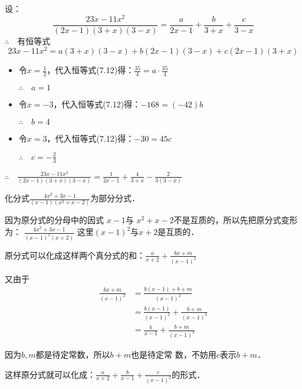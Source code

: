 \begin{solution}
设：
\begin{equation}
    \frac{23x-11x^2}{(2x-1)(3+x)(3-x)}=\frac{a}{2x-1}+\frac{b}{3+x}+\frac{c}{3-x}
\end{equation}
$\therefore\quad $有恒等式
\begin{equation}
    23x-11x^2=a(3+x)(3-x)+b(2x-1)(3-x)+c(2x-1)(3+x)
\end{equation}

\begin{itemize}
    \item 令$x=\frac{1}{2}$，代入恒等式(7.12)得：$\frac{35}{4}=a\cdot \frac{35}{4}$
    
    $\therefore\quad a=1$
    \item 令$x=-3$，代入恒等式(7.12)得：$-168=(-42)b$
    
    $\therefore\quad b=4$
    \item 令$x=3$，代入恒等式(7.12)得：$-30=45c$
    
    $\therefore\quad c=-\frac{2}{3}$
\end{itemize}
$\therefore\quad  \frac{23x-11x^2}{(2x-1)(3+x)(3-x)}=\frac{1}{2x-1}+\frac{4}{3+x}-\frac{2}{3(3-x)}$
\end{solution}

\begin{example}
    化分式$\frac{4x^2+3x-1}{(x-1)(x^2+x-2)}$为部分分式．
\end{example}

\begin{analyze}
    因为原分式的分母中的因式
    $x-1$与
    $x^2+x-2$不是互质的，所以先把原分式变形为：
    $\frac{4x^2+3x-1}{(x-1)^2(x+2)}$
    这里$(x-1)^2$与$x+2$是互质的．
    
    原分式可以化成这样两个真分式的和：$\frac{a}{x+2}+\frac{bx+m}{(x-1)^2}$

    又由于
\[\begin{split}
    \frac{bx+m}{(x-1)^2}&=\frac{b(x-1)+b+m}{(x-1)^2}\\
    &=\frac{b(x-1)}{(x-1)^2}+\frac{b+m}{(x-1)^2}\\
    &=\frac{b}{x-1}+\frac{b+m}{(x-1)^2}
\end{split}\]

因为$b,m$都是待定常数，所以$b+m$也是待定常
数，不妨用$c$表示$b+m$．

这样原分式就可以化成：$\frac{a}{x+2}+\frac{b}{x-1}+\frac{c}{(x-1)^2}$的形式．
\end{analyze}

